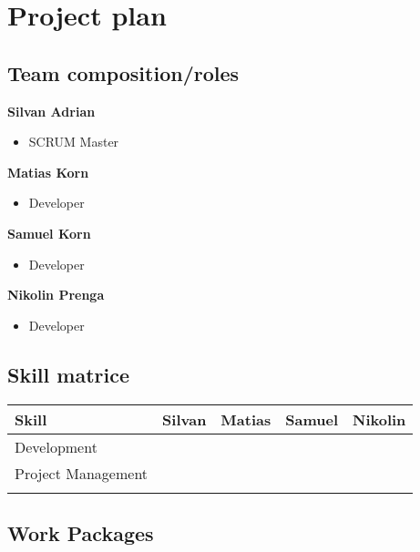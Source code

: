 
\newpage
\section{Project plan}

\subsection{Team composition/roles}
\textbf{Silvan Adrian}
\begin{itemize}
	\item SCRUM Master %
\end{itemize}
\textbf{Matias Korn}
\begin{itemize}
	\item Developer
\end{itemize}
\textbf{Samuel Korn}
\begin{itemize}
	\item Developer
\end{itemize}
\textbf{Nikolin Prenga}
\begin{itemize}
	\item Developer
\end{itemize}

\subsection{Skill matrice}
\begin{table}[htb!]
\begin{tabular}{lllll}
 \textbf{Skill}  & \textbf{Silvan} & \textbf{Matias} & \textbf{Samuel} & \textbf{Nikolin} \\
\hline
Development       &                 &                   &                   &                  \\
Project Management &                 &                   &                   &                  \\
                  &                 &                   &                   &                 
\end{tabular}
\end{table}

\subsection{Work Packages}

